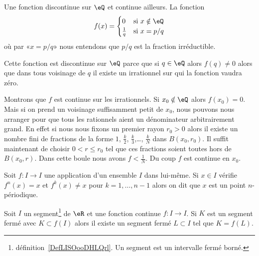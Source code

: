 \begin{example}
	Une fonction discontinue sur \( \eQ\) et continue ailleurs. La fonction
	\begin{equation}
		f(x)=\begin{cases}
			0             & \text{si } x\notin \eQ          \\
			\frac{1}{ q } & \text{si } x=p/q
		\end{cases}
	\end{equation}
	où par «\( x=p/q\)» nous entendons que \( p/q\) est la fraction irréductible.

	Cette fonction est discontinue sur \( \eQ\) parce que si \( q\in \eQ\) alors \( f(q)\neq 0\) alors que dans tous voisinage de \( q\) il existe un irrationnel sur qui la fonction vaudra zéro.

	Montrons que \( f\) est continue sur les irrationnels. Si \( x_0\notin \eQ\) alors \( f(x_0)=0\). Mais si on prend un voisinage suffisamment petit de \( x_0\), nous pouvons nous arranger pour que tous les rationnels aient un dénominateur arbitrairement grand. En effet si nous nous fixons un premier rayon \( r_0>0\) alors il existe un nombre fini de fractions de la forme \( 1\), \( \frac{ k }{2}\), \( \frac{ k }{ 3 }\),\ldots, \( \frac{ k }{ N }\) dans \( B(x_0,r_0)\). Il suffit maintenant de choisir \( 0<r\leq r_0\) tel que ces fractions soient toutes hors de \( B(x_0,r)\). Dans cette boule nous avons \( f<\frac{1}{ N }\). Du coup \( f\) est continue en \( x_0\).
\end{example}

\begin{definition}
	Soit \( f\colon I\to I\) une application d'un ensemble \( I\) dans lui-même. Si \( x\in I\) vérifie \( f^n(x)=x\) et \( f^k(x)\neq x\) pour \( k=1,\ldots, n-1\) alors on dit que \( x\) est un point \( n\)-périodique.
\end{definition}

\begin{lemma}       \label{LemAONBooGZBuYt}
	Soit \( I\) un segment\footnote{définition~\ref{DefLISOooDHLQrl}. Un segment est un intervalle fermé borné.} de \( \eR\) et une fonction continue \( f\colon I\to I\). Si \( K\) est un segment fermé avec \( K\subset f(I)\) alors il existe un segment fermé \( L\subset I\) tel que \( K=f(L)\).
\end{lemma}

